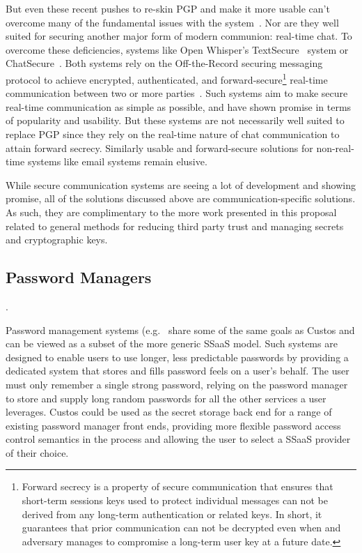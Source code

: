 But even these recent pushes to re-skin PGP and make it more usable
can't overcome many of the fundamental issues with the
system~\cite{green-pgp}. Nor are they well suited for securing another
major form of modern communion: real-time chat. To overcome these
deficiencies, systems like Open Whisper's
TextSecure~\cite{openwhisper} system or
ChatSecure~\cite{chatsecure}. Both systems rely on the Off-the-Record
securing messaging protocol to achieve encrypted, authenticated, and
forward-secure\footnote{Forward secrecy is a property of secure
  communication that ensures that short-term sessions keys used to
  protect individual messages can not be derived from any long-term
  authentication or related keys. In short, it guarantees that prior
  communication can not be decrypted even when and adversary manages
  to compromise a long-term user key at a future date.} real-time
communication between two or more parties~\cite{otr-v3, borisov2004,
  goldberg2009}. Such systems aim to make secure real-time
communication as simple as possible, and have shown promise in terms
of popularity and usability. But these systems are not necessarily
well suited to replace PGP since they rely on the real-time nature of
chat communication to attain forward secrecy. Similarly usable and
forward-secure solutions for non-real-time systems like email systems
remain elusive.

While secure communication systems are seeing a lot of development and
showing promise, all of the solutions discussed above are
communication-specific solutions. As such, they are complimentary to
the more work presented in this proposal related to general methods
for reducing third party trust and managing secrets and cryptographic
keys.

\subsection{Password Managers}

\cite{lastpass, onepassword, apple-icloud}
\cite{schneier-passwords, krebs-passwords, brodkin-passman}.


Password management systems (e.g.~\cite{lastpass} share some of the
same goals as Custos and can be viewed as a subset of the more generic
SSaaS model. Such systems are designed to enable users to use longer,
less predictable passwords by providing a dedicated system that stores
and fills password feels on a user's behalf. The user must only
remember a single strong password, relying on the password manager to
store and supply long random passwords for all the other services a
user leverages. Custos could be used as the secret storage back end
for a range of existing password manager front ends, providing more
flexible password access control semantics in the process and allowing
the user to select a SSaaS provider of their choice.

